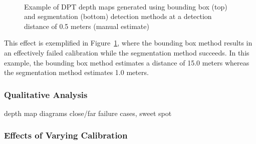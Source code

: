 \begin{figure}[htbp]
    \centering
    \\[1mm]
    \caption{Example of DPT depth maps generated using bounding box (top) and segmentation
        (bottom) detection methods at a detection distance of 0.5 meters (manual estimate)}
    \label{fig:bbox_vs_seg_close}
\end{figure}

This effect is exemplified in Figure~\ref{fig:bbox_vs_seg_close}, where the bounding box
method results in an effectively failed calibration while the segmentation method succeeds.
In this example, the bounding box method estimates a distance of 15.0 meters whereas the
segmentation method estimates 1.0 meters.


\clearpage

\subsubsection{Qualitative Analysis}
depth map diagrams
close/far failure cases, sweet spot

\subsubsection{Effects of Varying Calibration}